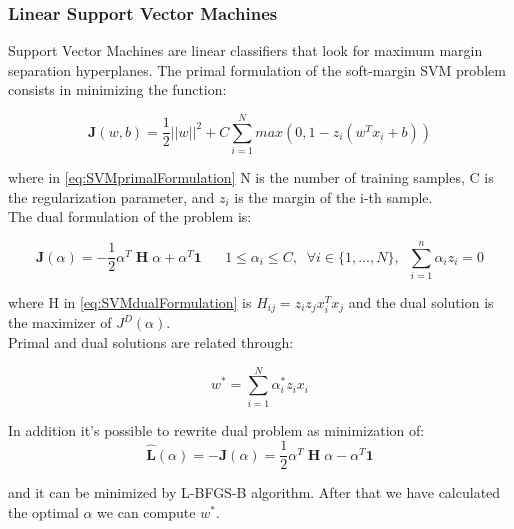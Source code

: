 
\subsubsection{Linear Support Vector Machines}
Support Vector Machines are linear classifiers that look for maximum margin separation hyperplanes.
The primal formulation of the soft-margin SVM problem consists in minimizing the function:

\begin{equation}
    \mathbf{J}(w,b)= \frac{1}{2}||w||^2 + C\sum_{i=1}^{N}max(0,1-z_i(w^Tx_i+b))
    \label{eq:SVMprimalFormulation}
\end{equation}

where in \autoref{eq:SVMprimalFormulation} N is the number of training samples, C is the regularization parameter,
and \(z_i\) is the margin of the i-th sample.\\
The dual formulation of the problem is:

\begin{equation}
    \mathbf{J}(\alpha)= - \frac{1}{2} \alpha^T \;\textbf{H} \;\alpha + \alpha^T \textbf{1} \;\;\;\;\;\;1\leq \alpha_i\leq C,\;\; \forall i \in \{1,...,N\},\;\; \sum_{i=1}^{n}\alpha_i z_i=0
    \label{eq:SVMdualFormulation}
\end{equation}

where H in  \autoref{eq:SVMdualFormulation} is \(H_{ij}=z_iz_jx_i^Tx_j\) and the dual solution is the maximizer of \(J^D(\alpha)\).\\
Primal and dual solutions are related through:

\begin{equation}
    w^*=\sum_{i=1}^{N}\alpha_i^* z_i x_i
\end{equation}

In addition it's possible to rewrite dual problem as minimization of:
\begin{equation}
    \hat{\mathbf{L}}(\alpha)=-\mathbf{J}(\alpha)= \frac{1}{2} \alpha^T \;\textbf{H} \;\alpha - \alpha^T \textbf{1}
\end{equation}

and it can be minimized by L-BFGS-B algorithm.
After that we have calculated the optimal \(\alpha\) we can compute \(w^*\).

